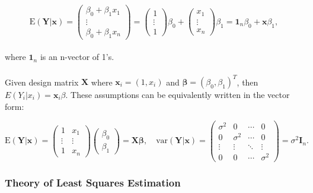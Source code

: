 \documentclass{article}\usepackage[]{graphicx}\usepackage[]{xcolor}
\numberwithin{equation}{section}
\begin{document}
\begin{equation}\label{eq:4-1}
\mathrm{E}(\mathbf{Y} | \mathbf{x}) =
\left( \begin{array}{ccc}
\beta_0+\beta_1 x_1\\
\vdots\\
\beta_0+\beta_1 x_n
\end{array} \right) = 
\left( \begin{array}{ccc}
1\\
\vdots\\
1
\end{array} \right) \beta_0 + 
\left( \begin{array}{ccc}
x_1\\
\vdots\\
x_n
\end{array} \right) \beta_1 =
\mathbf{1}_n \beta_0 + \mathbf{x} \beta_1 ,
\end{equation}
\\
\noindent
where $\mathbf{1}_n$ is an n-vector of 1's.
\\  
\\Given design matrix $\mathbf{X}$ where $\mathbf{x}_i = (1, x_i)$ and $\mathbf{\beta} = (\beta_0, \beta_1)^T$, then $E(Y_i|x_i) = \mathbf{x}_i \beta$. These assumptions can be equivalently written in the vector form:

\begin{equation}\label{eq:4-2}
\mathrm{E}(\mathbf{Y} | \mathbf{x}) = 
\left( \begin{array}{cc}
1 & x_1\\
\vdots& \vdots\\
1 & x_n
\end{array} \right) 
\left( \begin{array}{cc}
\beta_0 \\
\beta_1
\end{array} \right) = \mathbf{X} \boldsymbol{\beta}, \quad 
\text{var}(\mathbf{Y} | \mathbf{x}) =
\begin{pmatrix}
\sigma^2 & 0 & \cdots & 0 \\
0 & \sigma^2 & \cdots & 0 \\
\vdots & \vdots & \ddots & \vdots \\
0 & 0 & \cdots & \sigma^2
\end{pmatrix} = \sigma^2 \mathbf{I}_n.
\end{equation}

\subsubsection{Theory of Least Squares Estimation}
\end{document}
